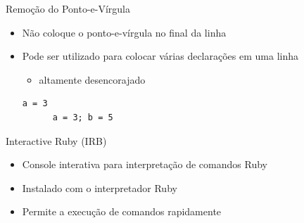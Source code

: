 \begin{frame}[fragile,t]{Remoção do Ponto-e-Vírgula}
  \begin{itemize}
    \item Não coloque o ponto-e-vírgula no final da linha
    \item Pode ser utilizado para colocar várias declarações em uma linha
    \begin{itemize}
      \item altamente desencorajado
    \end{itemize}
    \begin{lstlisting}[style=RubyInputStyle]
      a = 3	
      a = 3; b = 5 
    \end{lstlisting}
  \end{itemize}
\end{frame}

\begin{frame}[fragile,t]{Interactive Ruby (IRB)}
  \begin{itemize}
    \item Console interativa para interpretação de comandos Ruby
    \item Instalado com o interpretador Ruby
    \item Permite a execução de comandos rapidamente
  \end{itemize}
\end{frame}


